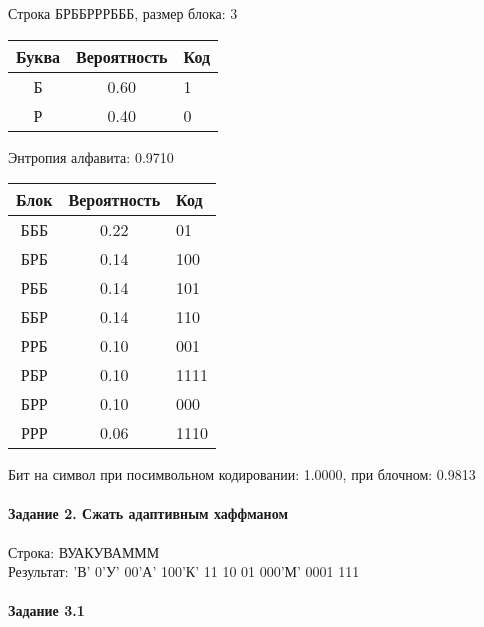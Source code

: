 \documentclass[a4paper, 12pt]{article}
\begin{document}
Строка БРББРРРБББ, размер блока: 3
\begin{center}
 \begin{tabular}{ |c|c|l| } 
  \hline
     Буква & Вероятность & Код\\ \hline
Б & 0.60 & 1\\\hline
Р & 0.40 & 0
\\ \hline \end{tabular}
\end{center}
Энтропия алфавита: 0.9710
\begin{center}
 \begin{tabular}{ |c|c|l| } 
  \hline
     Блок & Вероятность & Код\\ \hline
БББ & 0.22 & 01\\\hline
БРБ & 0.14 & 100\\\hline
РББ & 0.14 & 101\\\hline
ББР & 0.14 & 110\\\hline
РРБ & 0.10 & 001\\\hline
РБР & 0.10 & 1111\\\hline
БРР & 0.10 & 000\\\hline
РРР & 0.06 & 1110
\\ \hline \end{tabular}
\end{center}
Бит на символ при посимвольном кодировании: 1.0000, при блочном: 0.9813


\pagebreak
\paragraph{Задание 2. Сжать адаптивным хаффманом\\}

Строка: 
ВУАКУВАМММ\\
Результат: 'В' 0'У' 00'А' 100'К' 11 10 01 000'М' 0001 111










\pagebreak
\paragraph{Задание 3.1}
\end{document}

